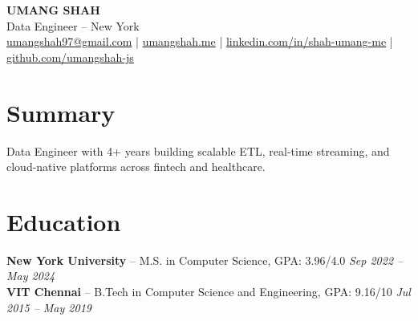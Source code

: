 \documentclass[10pt]{article}
\newcommand{\BodyTextSize}{\fontsize{10.5pt}{11.25pt}\selectfont}
\begin{document}
\begin{center}
{\LARGE \textbf{UMANG SHAH}}\\[-1pt]
Data Engineer -- New York\\[-1pt]
\BodyTextSize \href{mailto:umangshah97@gmail.com}{umangshah97@gmail.com} \;|\; \href{https://umangshah.me}{umangshah.me} \;|\; \href{https://www.linkedin.com/in/shah-umang-me}{linkedin.com/in/shah-umang-me} \;|\; \href{https://github.com/umangshah-js}{github.com/umangshah-js}
\end{center}

\vspace{-8pt}
\BodyTextSize

\section*{Summary}
Data Engineer with 4+ years building scalable ETL, real-time streaming, and cloud-native platforms across fintech and healthcare.

\vspace{0pt}

\section*{Education}
\textbf{New York University} -- M.S. in Computer Science, GPA: 3.96/4.0 \hfill \textit{Sep 2022 -- May 2024} \\
\textbf{VIT Chennai} -- B.Tech in Computer Science and Engineering, GPA: 9.16/10 \hfill \textit{Jul 2015 -- May 2019}

\vspace{0pt}
\end{document}
